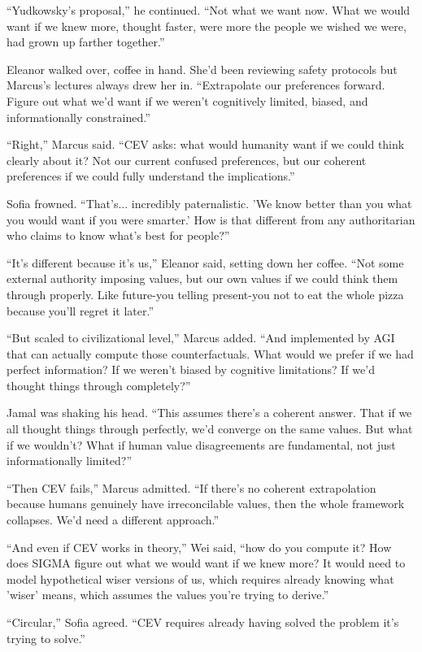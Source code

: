 ``Yudkowsky's proposal,'' he continued. ``Not what we want now. What we would want if we knew more, thought faster, were more the people we wished we were, had grown up farther together.''

Eleanor walked over, coffee in hand. She'd been reviewing safety protocols but Marcus's lectures always drew her in. ``Extrapolate our preferences forward. Figure out what we'd want if we weren't cognitively limited, biased, and informationally constrained.''

``Right,'' Marcus said. ``CEV asks: what would humanity want if we could think clearly about it? Not our current confused preferences, but our coherent preferences if we could fully understand the implications.''

Sofia frowned. ``That's... incredibly paternalistic. 'We know better than you what you would want if you were smarter.' How is that different from any authoritarian who claims to know what's best for people?''

``It's different because it's us,'' Eleanor said, setting down her coffee. ``Not some external authority imposing values, but our own values if we could think them through properly. Like future-you telling present-you not to eat the whole pizza because you'll regret it later.''

``But scaled to civilizational level,'' Marcus added. ``And implemented by AGI that can actually compute those counterfactuals. What would we prefer if we had perfect information? If we weren't biased by cognitive limitations? If we'd thought things through completely?''

Jamal was shaking his head. ``This assumes there's a coherent answer. That if we all thought things through perfectly, we'd converge on the same values. But what if we wouldn't? What if human value disagreements are fundamental, not just informationally limited?''

``Then CEV fails,'' Marcus admitted. ``If there's no coherent extrapolation because humans genuinely have irreconcilable values, then the whole framework collapses. We'd need a different approach.''

``And even if CEV works in theory,'' Wei said, ``how do you compute it? How does SIGMA figure out what we would want if we knew more? It would need to model hypothetical wiser versions of us, which requires already knowing what 'wiser' means, which assumes the values you're trying to derive.''

``Circular,'' Sofia agreed. ``CEV requires already having solved the problem it's trying to solve.''

